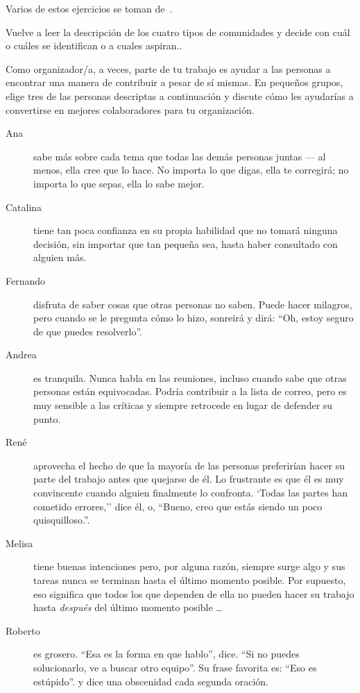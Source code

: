 Varios de estos ejercicios se toman de~\cite{Brow2007}.


Vuelve a leer la descripción de los cuatro tipos de comunidades
y decide con cuál o cuáles se identifican o a cuales aspiran..


Como organizador/a,
a veces, parte de tu trabajo es ayudar a las personas a encontrar una manera de contribuir a pesar de sí mismas.
En pequeños grupos,
elige tres de las personas descriptas a continuación
y discute cómo les ayudarías a convertirse en mejores colaboradores para tu organización.

\begin{description}

\item[Ana]
  sabe más sobre cada tema que todas las demás personas juntas --- al menos,
  ella cree que lo hace.
  No importa lo que digas,
  ella te corregirá;
  no importa lo que sepas, ella lo sabe mejor.
    
\item[Catalina]
  tiene tan poca confianza en su propia habilidad
  que no tomará ninguna decisión,
  sin importar que tan pequeña sea,
  hasta haber consultado con alguien más.

\item[Fernando]
  disfruta de saber cosas que otras personas no saben.
  Puede hacer milagros,
  pero cuando se le pregunta cómo lo hizo,
  sonreirá y dirá:
  ``Oh, estoy seguro de que puedes resolverlo''.

\item[Andrea]
  es tranquila.
  Nunca habla en las reuniones,
  incluso cuando sabe que otras personas están equivocadas.
  Podría contribuir a la lista de correo,
  pero es muy sensible a las críticas
  y siempre retrocede en lugar de defender su punto.

\item[René]
  aprovecha el hecho de que la mayoría de las personas preferirían hacer su parte del trabajo antes 
  que quejarse de él.
  Lo frustrante es que él es muy convincente cuando alguien finalmente lo confronta.
  `Todas las partes han cometido errores,''
  dice él,
  o, ``Bueno, creo que estás siendo un poco quisquilloso.''.

\item[Melisa]
  tiene buenas intenciones
  pero, por alguna razón, siempre surge algo
  y sus tareas nunca se terminan hasta el último momento posible.
  Por supuesto,
  eso significa que todos los que dependen de ella no pueden hacer su trabajo
  hasta \emph{después} del último momento posible {\ldots}
 
\item[Roberto]
 es grosero.
  ``Esa es la forma en que hablo'', dice.
  ``Si no puedes solucionarlo, ve a buscar otro equipo''.
  Su frase favorita es: ``Eso es estúpido''.
  y dice una obscenidad cada segunda oración.

\end{description}

